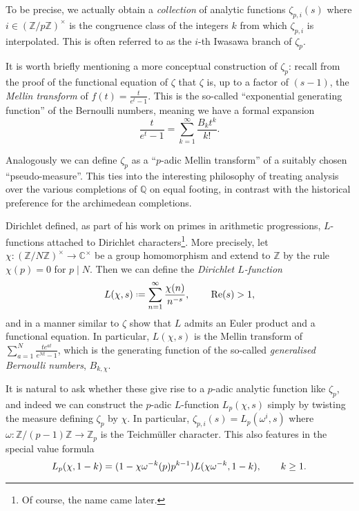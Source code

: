 \documentclass[11pt,a4paper]{article}
\newcommand{\Z}{\mathbb{Z}}
\newcommand{\Q}{\mathbb{Q}}
\newcommand{\C}{\mathbb{C}}
\newcommand*{\defeq}{\mathrel{\vcenter{\baselineskip0.5ex \lineskiplimit0pt
      \hbox{\scriptsize.}\hbox{\scriptsize.}}}%
  =}
\theoremstyle{plain}
\theoremstyle{definition}
\theoremstyle{remark}
\numberwithin{equation}{section}
\begin{document}
To be precise, we actually obtain a \emph{collection} of analytic
functions $\zeta_{p,i}(s)$ where $i\in (\Z/p\Z)^{\times}$ is the congruence class
of the integers $k$ from which $\zeta_{p,i}$ is interpolated. This is
often referred to as the $i$-th Iwasawa branch of $\zeta_{p}$. 

It is worth briefly mentioning a more conceptual construction of $\zeta_{p}$:
recall from the proof of the functional equation of $\zeta$ that
$\zeta$ is, up to a factor of $(s-1)$, the \emph{Mellin transform} of
$f(t) = \frac{t}{e^{t}-1}$. This is the so-called ``exponential generating function'' of the
Bernoulli numbers, meaning we have a formal expansion
\begin{equation}
  \label{eq:12}
  \frac{t}{e^{t}-1} = \sum_{k=1}^{\infty}\frac{B_{k}t^{k}}{k!}.
\end{equation}

Analogously we can define $\zeta_{p}$ as a
``$p$-adic Mellin transform'' of a suitably chosen
``pseudo-measure''. This ties into the interesting philosophy of
treating analysis over the various completions of $\Q$ on equal
footing, in contrast with the historical preference for the
archimedean completions.

Dirichlet defined, as part of his work on primes in arithmetic
progressions, $L$-functions attached to Dirichlet
characters\footnote{Of course, the name came later.}. More precisely,
let $\chi \colon (\Z/N\Z)^{\times}\to \C^{\times}$ be a group homomorphism and extend to
$\Z$ by the rule $\chi(p) = 0$ for $p \mid N$. Then we can define the
\emph{Dirichlet $L$-function}
\begin{equation}
  \label{eq:11}
 L(\chi,s) \defeq  \sum_{n =1}^{\infty}\frac{\chi(n)}{n^{-s}}, \qq{} \Re(s) > 1,
 \end{equation}
 and in a manner similar to $\zeta$ show that $L$ admits an Euler product
 and a functional equation. In particular, $L(\chi,s)$ is the Mellin
 transform of $\sum_{a=1}^{N}\frac{te^{at}}{e^{Nt}-1}$, which is the
 generating function of the so-called \emph{generalised Bernoulli
   numbers}, $B_{k,\chi}$.

 It is natural to ask whether these give rise
 to a $p$-adic analytic function like $\zeta_{p}$, and indeed we can
 construct the $p$-adic $L$-function $L_{p}(\chi,s)$ simply by twisting
 the measure defining $\zeta_{p}$ by $\chi$. In particular, $\zeta_{p,i}(s) =
 L_{p}(\omega^{i},s)$ where $\omega\colon \Z/(p-1)\Z \to \Z_{p}$ is the
 Teichmüller character. This also features in the special value
 formula
 \begin{equation}
   \label{eq:13}
   L_{p}(\chi,1-k) = (1-\chi\omega^{-k}(p)p^{k-1})L(\chi\omega^{-k},1-k), \qq{} k \geq 1.
 \end{equation}
\end{document}
